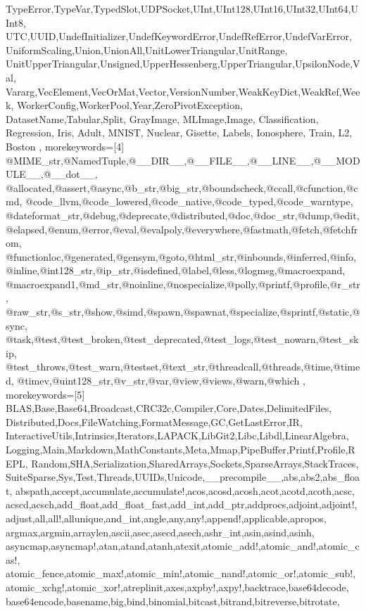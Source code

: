 {{TypeError,TypeVar,TypedSlot,UDPSocket,UInt,UInt128,UInt16,UInt32,UInt64,UInt8,%
UTC,UUID,UndefInitializer,UndefKeywordError,UndefRefError,UndefVarError,%
UniformScaling,Union,UnionAll,UnitLowerTriangular,UnitRange,%
UnitUpperTriangular,Unsigned,UpperHessenberg,UpperTriangular,UpsilonNode,Val,%
Vararg,VecElement,VecOrMat,Vector,VersionNumber,WeakKeyDict,WeakRef,Week,%
WorkerConfig,WorkerPool,Year,ZeroPivotException,%
DatasetName,Tabular,Split, GrayImage, MLImage,Image, Classification, Regression,%
Iris, Adult, MNIST, Nuclear, Gisette, Labels, Ionosphere, Train, L2, Boston 
},%
%
%
morekeywords=[4]
{%
@MIME_str,@NamedTuple,@__DIR__,@__FILE__,@__LINE__,@__MODULE__,@__dot__,%
@allocated,@assert,@async,@b_str,@big_str,@boundscheck,@ccall,@cfunction,@cmd,%
@code_llvm,@code_lowered,@code_native,@code_typed,@code_warntype,%
@dateformat_str,@debug,@deprecate,@distributed,@doc,@doc_str,@dump,@edit,%
@elapsed,@enum,@error,@eval,@evalpoly,@everywhere,@fastmath,@fetch,@fetchfrom,%
@functionloc,@generated,@gensym,@goto,@html_str,@inbounds,@inferred,@info,%
@inline,@int128_str,@ip_str,@isdefined,@label,@less,@logmsg,@macroexpand,%
@macroexpand1,@md_str,@noinline,@nospecialize,@polly,@printf,@profile,@r_str,%
@raw_str,@s_str,@show,@simd,@spawn,@spawnat,@specialize,@sprintf,@static,@sync,%
@task,@test,@test_broken,@test_deprecated,@test_logs,@test_nowarn,@test_skip,%
@test_throws,@test_warn,@testset,@text_str,@threadcall,@threads,@time,@timed,%
@timev,@uint128_str,@v_str,@var,@view,@views,@warn,@which%
},%
%
%
morekeywords=[5]
{%
BLAS,Base,Base64,Broadcast,CRC32c,Compiler,Core,Dates,DelimitedFiles,%
Distributed,Docs,FileWatching,FormatMessage,GC,GetLastError,IR,%
InteractiveUtils,Intrinsics,Iterators,LAPACK,LibGit2,Libc,Libdl,LinearAlgebra,%
Logging,Main,Markdown,MathConstants,Meta,Mmap,PipeBuffer,Printf,Profile,REPL,%
Random,SHA,Serialization,SharedArrays,Sockets,SparseArrays,StackTraces,%
SuiteSparse,Sys,Test,Threads,UUIDs,Unicode,__precompile__,abs,abs2,abs_float,%
abspath,accept,accumulate,accumulate!,acos,acosd,acosh,acot,acotd,acoth,acsc,%
acscd,acsch,add_float,add_float_fast,add_int,add_ptr,addprocs,adjoint,adjoint!,%
adjust,all,all!,allunique,and_int,angle,any,any!,append!,applicable,apropos,%
argmax,argmin,arraylen,ascii,asec,asecd,asech,ashr_int,asin,asind,asinh,%
asyncmap,asyncmap!,atan,atand,atanh,atexit,atomic_add!,atomic_and!,atomic_cas!,%
atomic_fence,atomic_max!,atomic_min!,atomic_nand!,atomic_or!,atomic_sub!,%
atomic_xchg!,atomic_xor!,atreplinit,axes,axpby!,axpy!,backtrace,base64decode,%
base64encode,basename,big,bind,binomial,bitcast,bitrand,bitreverse,bitrotate,%
}}
